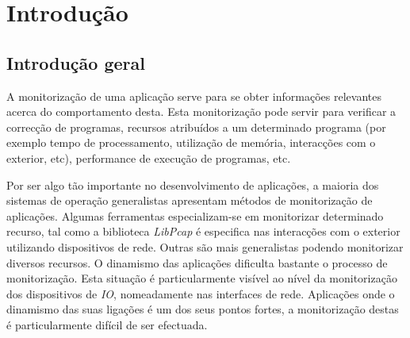 \chapter{Introdução}\label{cap:introducao}




\section{Introdução geral} \label{sect:introducao}

A monitorização de uma aplicação serve para se obter informações relevantes acerca do comportamento desta. Esta monitorização pode servir para verificar a correcção de programas, recursos atribuídos a um determinado programa (por exemplo tempo de processamento, utilização de memória, interacções com o exterior, etc), performance de execução de programas, etc.

Por ser algo tão importante no desenvolvimento de aplicações, a maioria dos sistemas de operação generalistas apresentam métodos de monitorização de aplicações. Algumas ferramentas especializam-se em monitorizar determinado recurso, tal como a biblioteca \textit{LibPcap} é especifica nas interacções com o exterior utilizando dispositivos de rede. Outras são mais generalistas podendo monitorizar diversos recursos.
O dinamismo das aplicações dificulta bastante o processo de monitorização. Esta situação é particularmente visível ao nível da monitorização dos dispositivos de \textit{IO}, nomeadamente nas interfaces de rede.
Aplicações onde o dinamismo das suas ligações é um dos seus pontos fortes, a monitorização destas é particularmente difícil de ser efectuada.

